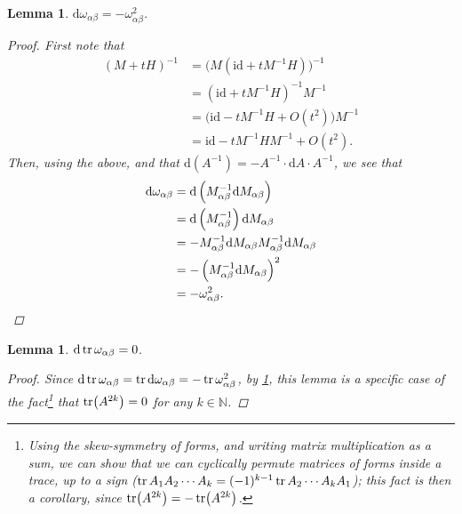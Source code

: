 \documentclass[11pt,fleqn]{article}
\theoremstyle{plain}
\newtheorem{lemma}[theorem]{Lemma}
\theoremstyle{definition}
\theoremstyle{remark}
\numberwithin{equation}{theorem}
\newcommand{\id}{\mathrm{id}}
\renewcommand{\d}{\mathrm{d}}
\begin{document}
        \begin{lemma}\label{lemma:d-omega-is-minus-omega-squared}
            $\d\omega_{\alpha\beta}=-\omega_{\alpha\beta}^2$.
            \begin{proof}
                First note that
                \begin{align*}
                    (M+tH)^{-1}
                    &=
                    \big(M(\id+tM^{-1}H)\big)^{-1}
                \\  &=
                    (\id+tM^{-1}H)^{-1}M^{-1}
                \\  &=
                    \big(\id-tM^{-1}H+O(t^2)\big)M^{-1}
                \\  &=
                    \id-tM^{-1}HM^{-1}+O(t^2).
                \end{align*}
                Then, using the above, and that $\d \left(A^{-1}\right)=-A^{-1}\cdot\d A\cdot A^{-1}$, we see that
                \begin{align*}
                    \d\omega_{\alpha\beta} &= \d\left(M_{\alpha\beta}^{-1}\d M_{\alpha\beta}\right)
                \\  &= \d \left(M_{\alpha\beta}^{-1}\right)\d M_{\alpha\beta}
                \\  &= -M_{\alpha\beta}^{-1}\d M_{\alpha\beta}M_{\alpha\beta}^{-1}\d M_{\alpha\beta}
                \\  &= -\left(M_{\alpha\beta}^{-1}\d M_{\alpha\beta}\right)^2
                \\  &= -\omega_{\alpha\beta}^2.\qedhere
                \end{align*}
            \end{proof}
        \end{lemma}

        \begin{lemma}\label{lemma:d-tr-omega-is-zero}
            $\d\tr\omega_{\alpha\beta}=0$.
            \begin{proof}
                Since $\d\tr\omega_{\alpha\beta}=\tr\d\omega_{\alpha\beta}=-\tr\omega_{\alpha\beta}^2$, by \cref{lemma:d-omega-is-minus-omega-squared}, this lemma is a specific case of the fact\footnote{Using the skew-symmetry of forms, and writing matrix multiplication as a sum, we can show that we can cyclically permute matrices of forms inside a trace, up to a sign ($\tr A_1 A_2\cdots A_k=(-1)^{k-1}\tr A_2\cdots A_k A_1$); this fact is then a corollary, since $\tr(A^{2k})=-\tr(A^{2k})$.} that $\tr(A^{2k})=0$ for any $k\in\mathbb{N}$.
            \end{proof}
        \end{lemma}
\end{document}
